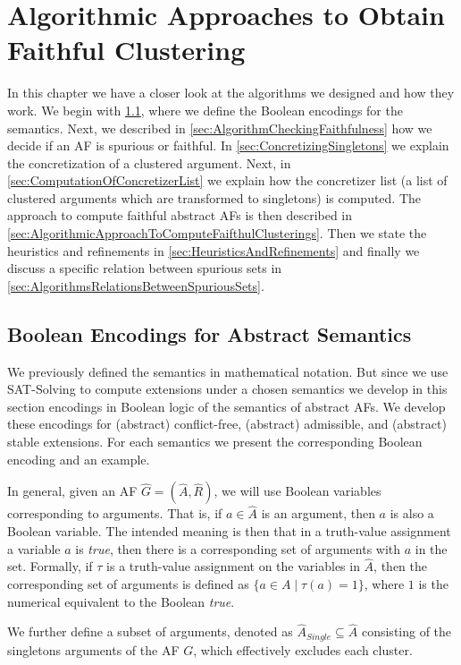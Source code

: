 \chapter{Algorithmic Approaches to Obtain Faithful Clustering}
In this chapter we have a closer look at the algorithms we designed and how they work.
We begin with \cref{sec:Encodings}, where we define the Boolean encodings for the semantics. Next, we described in \cref{sec:AlgorithmCheckingFaithfulness} how we decide if an AF is spurious or faithful. In \cref{sec:ConcretizingSingletons} we explain the concretization of a clustered argument. Next, in \cref{sec:ComputationOfConcretizerList} we explain how the concretizer list (a list of clustered arguments which are transformed to singletons) is computed. The approach to compute faithful abstract AFs is then described in \cref{sec:AlgorithmicApproachToComputeFaifthulClusterings}. Then we state the heuristics and refinements in \cref{sec:HeuristicsAndRefinements} and finally we discuss a specific relation between spurious sets in \cref{sec:AlgorithmsRelationsBetweenSpuriousSets}.


\section{Boolean Encodings for Abstract Semantics}
\label{sec:Encodings}
We previously defined the semantics in mathematical notation. But since we use SAT-Solving to compute extensions under a chosen semantics we develop in this section encodings in Boolean logic of the semantics of abstract AFs. We develop these encodings for (abstract) conflict-free, (abstract) admissible, and (abstract) stable extensions. For each semantics we present the corresponding Boolean encoding and an example.

In general, given an AF $\hat{G}=(\hat{A}, \hat{R})$, we will use Boolean variables corresponding to arguments. That is, if $a \in \hat{A}$ is an argument, then $a$ is also a Boolean variable. The intended meaning is then that in a truth-value assignment a variable $a$ is \emph{true}, then there is a corresponding set of arguments with $a$ in the set. Formally, if $\tau$ is a truth-value assignment on the variables in $\hat{A}$, then the corresponding set of arguments is defined as $\{a \in A \mid \tau(a) = 1\}$, where $1$ is the numerical equivalent to the Boolean \emph{true}.

We further define a subset of arguments, denoted as $\hat{A}_{\mathit{Single}} \subseteq \hat{A}$ consisting of the singletons arguments of the AF $G$, which effectively excludes each cluster.



